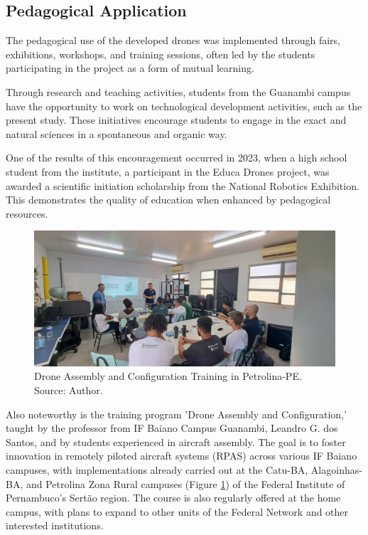 \documentclass[conference]{IEEEtran}
\begin{document}
\subsection{Pedagogical Application}

The pedagogical use of the developed drones was implemented through fairs, exhibitions, workshops, and training sessions, often led by the students participating in the project as a form of mutual learning.

Through research and teaching activities, students from the Guanambi campus have the opportunity to work on technological development activities, such as the present study. These initiatives encourage students to engage in the exact and natural sciences in a spontaneous and organic way.

One of the results of this encouragement occurred in 2023, when a high school student from the institute, a participant in the Educa Drones project, was awarded a scientific initiation scholarship from the National Robotics Exhibition. This demonstrates the quality of education when enhanced by pedagogical resources.

\begin{figure}[!htb]
    \centering
    \includegraphics[scale=0.12]{img/petrolina.jpg} 
    \caption{Drone Assembly and Configuration Training in Petrolina-PE. Source: Author.}
    \label{fig:petrolina}
\end{figure}

Also noteworthy is the training program 'Drone Assembly and Configuration,' taught by the professor from IF Baiano Campus Guanambi, Leandro G. dos Santos, and by students experienced in aircraft assembly. The goal is to foster innovation in remotely piloted aircraft systems (RPAS) across various IF Baiano campuses, with implementations already carried out at the Catu-BA, Alagoinhas-BA, and Petrolina Zona Rural campuses (Figure \ref{fig:petrolina}) of the Federal Institute of Pernambuco’s Sertão region. The course is also regularly offered at the home campus, with plans to expand to other units of the Federal Network and other interested institutions.
\end{document}
